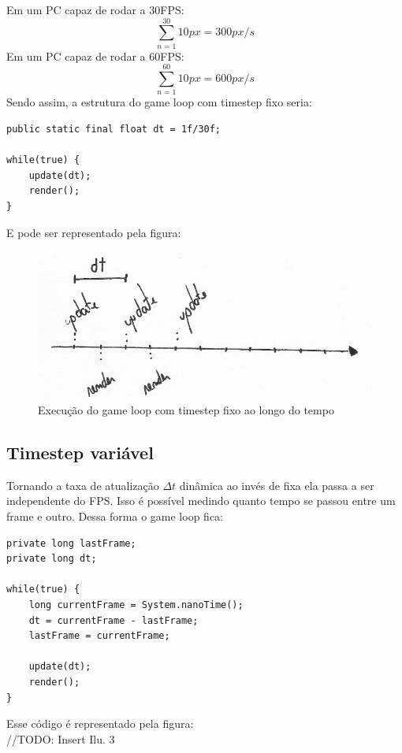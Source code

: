 \documentclass[12pt, 
openright, 
oneside, 
a4paper,    
brazil]{facom-ufu-abntex2}
\begin{document}
Em um PC capaz de rodar a 30FPS: $$\sum_{n=1}^{30} 10px = 300 px/s$$
Em um PC capaz de rodar a 60FPS: $$\sum_{n=1}^{60} 10px = 600 px/s$$
Sendo assim, a estrutura do game loop com timestep fixo seria:
\begin{lstlisting}[caption=Game Loop com timestep fixo]
public static final float dt = 1f/30f;

while(true) {
	update(dt);
	render();
}
\end{lstlisting}
E pode ser representado pela figura:
\begin{figure}[H]
	\centering
	\includegraphics[width=\textwidth]{imagens/ilu2.png}
	\caption{Execução do game loop com timestep fixo ao longo do tempo}
\end{figure}
\subsection{Timestep variável}
Tornando a taxa de atualização $\Delta t$ dinâmica ao invés de fixa ela passa a ser independente do FPS. Isso é possível medindo quanto tempo se passou entre um frame e outro. Dessa forma o game loop fica:\\
\begin{lstlisting}[caption=Game loop com timestep variável]
private long lastFrame;
private long dt;
		
while(true) {
	long currentFrame = System.nanoTime(); 
	dt = currentFrame - lastFrame;
	lastFrame = currentFrame;
	
	update(dt);
	render();
}
\end{lstlisting}
Esse código é representado pela figura:
\\//TODO: Insert Ilu. 3\\
\end{document}
